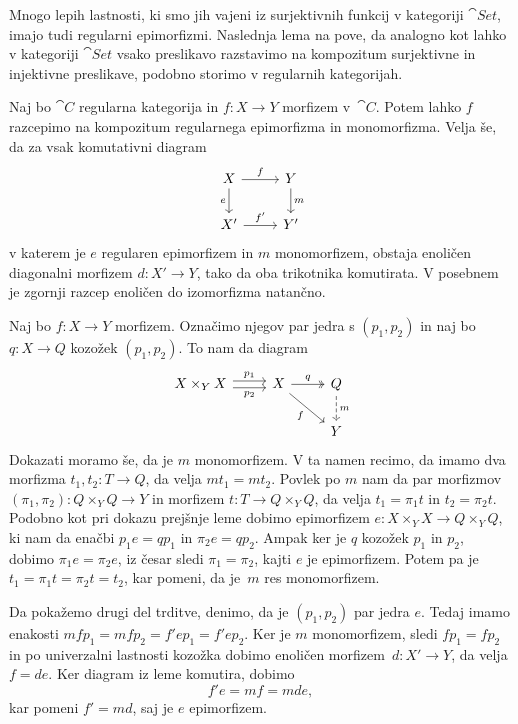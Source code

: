 \documentclass[../kategoricna_logika.tex]{subfiles}
\begin{document}
Mnogo lepih lastnosti, ki smo
jih vajeni iz surjektivnih funkcij v kategoriji $\cat{Set}$, imajo
tudi regularni epimorfizmi.
Naslednja lema na pove, da analogno kot lahko v kategoriji $\cat{Set}$
vsako preslikavo razstavimo na kompozitum surjektivne in
injektivne preslikave, podobno storimo v regularnih kategorijah.
\begin{lema}
  Naj bo $\cat{C}$ regularna kategorija in $f: X \to Y$ morfizem
  v~$\cat{C}$.  Potem lahko $f$ razcepimo na kompozitum regularnega
  epimorfizma in mono\-morfizma.  Velja še, da za vsak komutativni
  diagram
  \begin{equation*}
    \begin{tikzcd}
      X \ar[d, "e"'] \ar[r, "f"] & Y \ar[d, "m"] \\
      X' \ar[r, "f'"] & Y'
    \end{tikzcd}
  \end{equation*}
  v katerem je $e$ regularen epimorfizem in $m$ monomorfizem, obstaja
  enoličen diagonalni morfizem $d : X' \to Y$, tako da oba trikotnika
  komutirata.  V posebnem je zgornji razcep enoličen do izomorfizma
  natančno.
\end{lema}
\begin{comment}
  \begin{opomba}
    Pokažimo, da zgornja trditev res pomeni, da so slike morfizmov
    enolične.
  \end{opomba}
\end{comment}
\begin{dokaz}
  Naj bo $f : X \to Y$ morfizem.  Označimo njegov par jedra s
  $(p_1, p_2)$ in naj bo $q : X \to Q$ kozožek $(p_1, p_2)$.  To nam da
  diagram
  \begin{equation*}
    \begin{tikzcd}
      X \times_Y X \ar[r, shift left, "p_1"] \ar[r, shift right,
      "p_2"'] &
      X \ar[dr, "f"'] \ar[r, two heads, "q"] & Q \ar[d, dashed, "m"] \\
      & & Y
    \end{tikzcd}
  \end{equation*}
  Dokazati moramo še, da je $m$ monomorfizem. V ta namen recimo, da
  imamo dva morfizma $t_1, t_2 : T \to Q$, da velja $m t_1 = m
  t_2$. Povlek po $m$ nam da par morfizmov
  $(\pi_1, \pi_2) : Q \times_Y Q \to Y$ in morfizem
  $t : T \to Q \times_Y Q$, da velja $t_1 = \pi_1 t$ in
  $t_2 = \pi_2 t$.  Podobno kot pri dokazu prejšnje leme dobimo
  epimorfizem $e : X \times_Y X \to Q \times_Y Q$, ki nam da enačbi
  $p_1 e = q p_1$ in $\pi_2 e = q p_2$.  Ampak ker je $q$ kozožek
  $p_1$ in $p_2$, dobimo $\pi_1 e = \pi_2 e$, iz česar sledi
  $\pi_1 = \pi_2$, kajti $e$ je epimorfizem.  Potem pa je
  $t_1 = \pi_1 t = \pi_2 t = t_2$, kar pomeni, da je~$m$ res
  monomorfizem.

  Da pokažemo drugi del trditve, denimo, da je $(p_1, p_2)$ par jedra
  $e$.  Tedaj imamo enakosti
  $m f p_1 = m f p_2 = f' e p_1 = f' e p_2$.  Ker je $m$ monomorfizem,
  sledi $f p_1 = f p_2$ in po univerzalni lastnosti kozožka dobimo
  enoličen morfizem~$d : X' \to Y$, da velja $f = d e$. Ker diagram
  iz leme komutira, dobimo
  \[f' e = m f = m d e, \] kar pomeni $f' = m d$, saj je $e$
  epimorfizem.
\end{dokaz}
\end{document}
